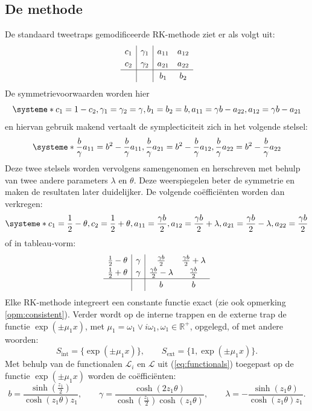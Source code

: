 \documentclass[12pt]{article}
\begin{document}
\subsection{De methode}
De standaard tweetraps gemodificeerde RK-methode ziet er als volgt uit:
\[
\renewcommand\arraystretch{1.2}
\begin{array}
{c|c|cc}
c_1 & \gamma_1 & a_{11} & a_{12} \\
c_2 & \gamma_2 & a_{21} & a_{22} \\
\hline
&& b_1 & b_2 
\end{array}
\]
De symmetrievoorwaarden worden hier
\[\systeme*{c_1=1-c_2,\gamma_1=\gamma_2=\gamma,b_1=b_2=b,a_{11}=\gamma b-a_{22},a_{12}=\gamma b-a_{21}}\]
en hiervan gebruik makend vertaalt de symplecticiteit zich in het volgende stelsel:
\[\systeme*{\frac{b}{\gamma}a_{11}=b^2-\frac{b}{\gamma}a_{11},\frac{b}{\gamma}a_{21}=b^2-\frac{b}{\gamma}a_{12},\frac{b}{\gamma}a_{22}=b^2-\frac{b}{\gamma}a_{22}}\]
Deze twee stelsels worden vervolgens samengenomen en herschreven met behulp van twee andere parameters \(\lambda\) en \(\theta\). Deze weerspiegelen beter de symmetrie en maken de resultaten later duidelijker. De volgende coëfficiënten worden dan verkregen:
\[\systeme*{c_1=\frac{1}{2}-\theta,c_2=\frac{1}{2}+\theta,a_{11}=\frac{\gamma b}{2},a_{12}=\frac{\gamma b}{2}+\lambda,a_{21}=\frac{\gamma b}{2}-\lambda,a_{22}=\frac{\gamma b}{2}}\]
of in tableau-vorm:
\begin{equation} \label{eq:rks2}
\renewcommand\arraystretch{1.2}
\begin{array}
{c|c|cc}
\frac{1}{2}-\theta & \gamma & \frac{\gamma b}{2} & \frac{\gamma b}{2}+\lambda \\
\frac{1}{2}+\theta & \gamma & \frac{\gamma b}{2}-\lambda & \frac{\gamma b}{2} \\
\hline
&& b & b 
\end{array}
\end{equation}
Elke RK-methode integreert een constante functie exact (zie ook opmerking \ref{opm:consistent}). Verder wordt op de interne trappen en de externe trap de functie \(\exp(\pm\mu_1x)\), met \(\mu_1=\omega_1\vee i\omega_1,\omega_1\in\mathbb{R}^+\), opgelegd, of met andere woorden:
\[S_{\textrm{int}}=\{\exp(\pm\mu_1x)\},\qquad S_{\textrm{ext}}=\{1,\exp(\pm\mu_1x)\}.\]
Met behulp van de functionalen \(\mathcal{L}_i\) en \(\mathcal{L}\) uit (\ref{eq:functionals}) toegepast op de functie \(\exp(\pm\mu_1x)\) worden de coëfficiënten:
\begin{equation} \label{eq:rks2coeff}
    b=\frac{\sinh(\frac{z_1}{2})}{\cosh(z_1\theta)z_1},\qquad\gamma=\frac{\cosh(2z_1\theta)}{\cosh(\frac{z_1}{2})\cosh(z_1\theta)},\qquad\lambda=-\frac{\sinh(z_1\theta)}{\cosh(z_1\theta)z_1}.
\end{equation}
\end{document}
